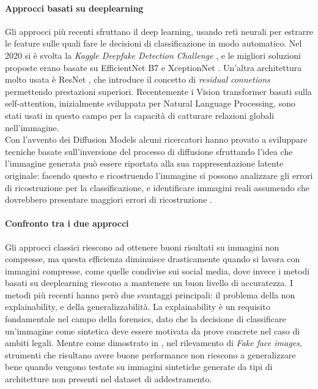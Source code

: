 \paragraph{Approcci basati su deeplearning} Gli approcci più recenti sfruttano il deep learning, usando reti neurali per estrarre le feature sulle quali fare le decisioni di classificazione in modo automatico.
Nel 2020 si è svolta la \textit{Kaggle Deepfake Detection Challenge} \cite{dolhansky2020deepfakedetectionchallengedfdc} , e le migliori soluzioni proposte erano basate su EfficientNet B7 \cite{pmlr-v97-tan19a} e XceptionNet \cite{8099678}.
Un'altra architettura molto usata è ResNet \cite{7780459}, che introduce il concetto di \textit{residual connetions} permettendo prestazioni superiori.
Recentemente i Vision transformer basati sulla self-attention, inizialmente  sviluppata per Natural Language Processing, sono stati usati in questo campo per la capacità di catturare relazioni globali nell'immagine.\\
Con l'avvento dei Diffusion Models alcuni ricercatori hanno provato a sviluppare tecniche basate sull'inversione del processo di diffusione sfruttando l'idea che l'immagine generata può essere riportata alla sua rappresentazione latente originale: facendo questo e ricostruendo l'immagine si possono analizzare gli errori di ricostruzione per la classificazione, e identificare immagini reali assumendo che dovrebbero presentare maggiori errori di ricostruzione \cite{wang2023dire}. 
\paragraph{Confronto tra i due approcci}
Gli approcci classici riescono ad ottenere buoni risultati su immagini non compresse, ma questa efficienza diminuisce drasticamente quando si lavora con immagini compresse, come quelle condivise sui social media, dove invece i metodi basati su deeplearning riescono a mantenere un buon livello di accuratezza. 
I metodi più recenti hanno però due svantaggi principali: il problema della non explainability, e della generalizzabilità.
La explainability è un requisito fondamentale nel campo della forensics, dato che la decisione di classificare un'immagine come sintetica deve essere motivata da prove concrete nel caso di ambiti legali.
Mentre come dimostrato in \cite{khodabakhsh2018fake}, nel rilevamento di \textit{Fake face images}, strumenti che risultano avere buone performance non riescono a generalizzare bene quando vengono testate su immagini sintetiche generate da tipi di architetture non presenti nel dataset di addestramento.
\newpage
